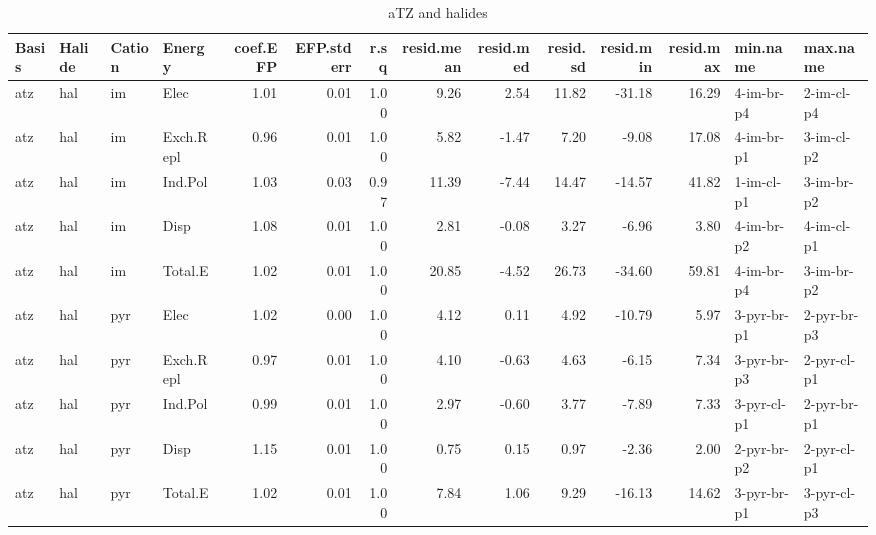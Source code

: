 \documentclass[a4paper]{article}
\begin{document}
\begin{landscape}
\begin{table}[ht]
\centering
\begin{tabular}{llllrrrrrrrrll}
  \hline
Basis & Halide & Cation & Energy & coef.EFP & EFP.stderr & r.sq & resid.mean & resid.med & resid.sd & resid.min & resid.max & min.name & max.name \\ 
  \hline
atz & hal & im & Elec & 1.01 & 0.01 & 1.00 & 9.26 & 2.54 & 11.82 & -31.18 & 16.29 & 4-im-br-p4 & 2-im-cl-p4 \\ 
  atz & hal & im & Exch.Repl & 0.96 & 0.01 & 1.00 & 5.82 & -1.47 & 7.20 & -9.08 & 17.08 & 4-im-br-p1 & 3-im-cl-p2 \\ 
  atz & hal & im & Ind.Pol & 1.03 & 0.03 & 0.97 & 11.39 & -7.44 & 14.47 & -14.57 & 41.82 & 1-im-cl-p1 & 3-im-br-p2 \\ 
  atz & hal & im & Disp & 1.08 & 0.01 & 1.00 & 2.81 & -0.08 & 3.27 & -6.96 & 3.80 & 4-im-br-p2 & 4-im-cl-p1 \\ 
  atz & hal & im & Total.E & 1.02 & 0.01 & 1.00 & 20.85 & -4.52 & 26.73 & -34.60 & 59.81 & 4-im-br-p4 & 3-im-br-p2 \\ 
  atz & hal & pyr & Elec & 1.02 & 0.00 & 1.00 & 4.12 & 0.11 & 4.92 & -10.79 & 5.97 & 3-pyr-br-p1 & 2-pyr-br-p3 \\ 
  atz & hal & pyr & Exch.Repl & 0.97 & 0.01 & 1.00 & 4.10 & -0.63 & 4.63 & -6.15 & 7.34 & 3-pyr-br-p3 & 2-pyr-cl-p1 \\ 
  atz & hal & pyr & Ind.Pol & 0.99 & 0.01 & 1.00 & 2.97 & -0.60 & 3.77 & -7.89 & 7.33 & 3-pyr-cl-p1 & 2-pyr-br-p1 \\ 
  atz & hal & pyr & Disp & 1.15 & 0.01 & 1.00 & 0.75 & 0.15 & 0.97 & -2.36 & 2.00 & 2-pyr-br-p2 & 2-pyr-cl-p1 \\ 
  atz & hal & pyr & Total.E & 1.02 & 0.01 & 1.00 & 7.84 & 1.06 & 9.29 & -16.13 & 14.62 & 3-pyr-br-p1 & 3-pyr-cl-p3 \\ 
   \hline
\end{tabular}
\caption{aTZ and halides}
\end{table}



\end{landscape}
\end{document}
